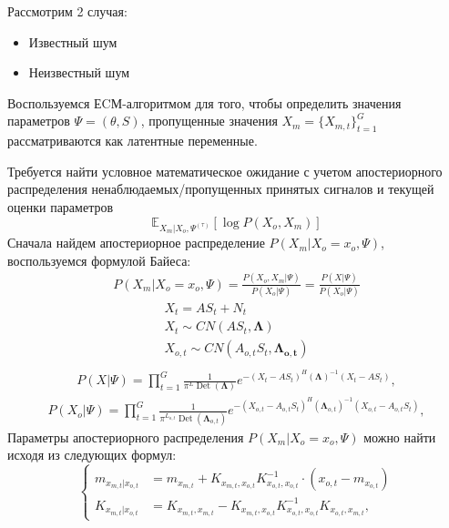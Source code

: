 \documentclass[11pt]{article}
\newcommand{\Expect}{\mathbb{E}}
\DeclareMathOperator{\Det}{Det}
\begin{document}
Рассмотрим 2 случая:
\begin{itemize}
\item
Известный шум
\item
Неизвестный шум
\end{itemize}
\begin{center}
\fontsize{16}{20}\selectfont {}
\end{center}
Воспользуемся ЕCМ-алгоритмом для того, чтобы определить значения параметров $\Psi = (\theta, S)$, пропущенные значения $X_m=\{X_{m,t}\}_{t=1}^G$ рассматриваются как латентные переменные.
\begin{center}
\fontsize{14}{18}\selectfont {}
\end{center}
Требуется найти условное математическое ожидание с учетом апостериорного распределения ненаблюдаемых/пропущенных принятых сигналов и текущей оценки параметров
\begin{equation}
 \Expect_{X_m|X_o, \Psi^{(\tau)}}[\log P(X_o, X_m)]
\end{equation}
Сначала найдем апостериорное распределение $P(X_m|X_o=x_o,\Psi)$, воспользуемся формулой Байеса:
\begin{gather}
P(X_m|X_o=x_o,\Psi) = \frac{P(X_o, X_m|\Psi)}{P(X_o|\Psi)} = \frac{P(X|\Psi)}{P(X_o|\Psi)}
\end{gather}
\begin{gather*}
X_t = AS_t + N_t \\
X_t \sim CN(A S_t,\mathbf{\Lambda})\\
X_{o,t} \sim CN( A_{o,t}S_t, \mathbf{\Lambda_{o,t}})\\
\end{gather*}
\begin{gather}
P(X|\Psi) = \prod_{t=1}^G \frac{1}{\pi^L \Det(\mathbf{\Lambda})}e^{-(X_t-AS_t)^H (\mathbf{\Lambda})^{-1}(X_t-AS_t)},
\end{gather}
\begin{gather}
P(X_o|\Psi) = \prod_{t=1}^G \frac{1}{\pi^{L_{o,t}} \Det(\mathbf{\Lambda}_{o,t})}e^{-(X_{o,t}-A_{o,t}S_t)^H (\mathbf{\Lambda}_{o,t})^{-1}(X_{o,t}-A_{o,t}S_t)},
\end{gather}
Параметры апостериорного распределения $P(X_m|X_o=x_o,\Psi)$ можно найти исходя из следующих формул:
\begin{equation}
\left\{ \begin{aligned}
m_{x_{m,t}|x_{o,t}} &= m_{x_{m,t}} + K_{x_{m,t},x_{o,t}}K_{x_{o,t},x_{o,t}}^{-1}\cdot(x_{o,t}-m_{x_{o,t}}) \\
K_{x_{m,t}|x_{o,t}} &= K_{x_{m,t},x_{m,t}}-K_{x_{m,t},x_{o,t}}K_{x_{o,t},x_{o,t}}^{-1}K_{x_{o,t},x_{m,t}},
\end{aligned} \right.
\end{equation}
\end{document}
